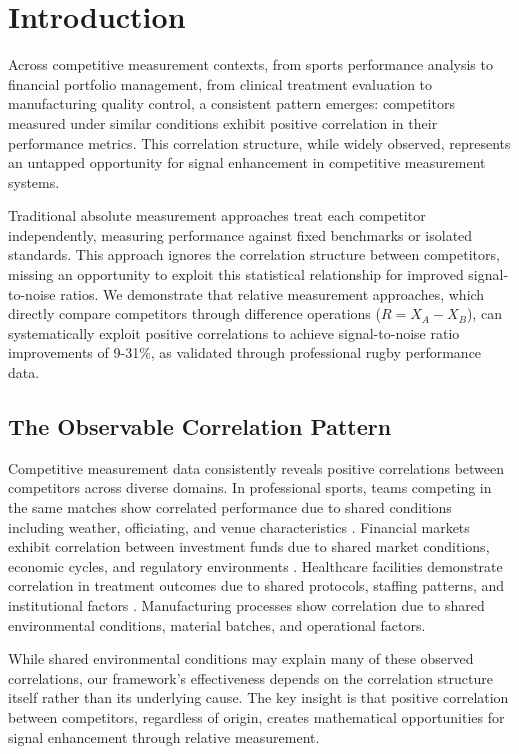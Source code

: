 \section{Introduction}

Across competitive measurement contexts, from sports performance analysis to financial portfolio management, from clinical treatment evaluation to manufacturing quality control, a consistent pattern emerges: competitors measured under similar conditions exhibit positive correlation in their performance metrics. This correlation structure, while widely observed, represents an untapped opportunity for signal enhancement in competitive measurement systems.

Traditional absolute measurement approaches treat each competitor independently, measuring performance against fixed benchmarks or isolated standards. This approach ignores the correlation structure between competitors, missing an opportunity to exploit this statistical relationship for improved signal-to-noise ratios. We demonstrate that relative measurement approaches, which directly compare competitors through difference operations ($R = X_A - X_B$), can systematically exploit positive correlations to achieve signal-to-noise ratio improvements of 9-31\%, as validated through professional rugby performance data.

\subsection{The Observable Correlation Pattern}

Competitive measurement data consistently reveals positive correlations between competitors across diverse domains. In professional sports, teams competing in the same matches show correlated performance due to shared conditions including weather, officiating, and venue characteristics \cite{bennett2019descriptive, scott2023performance}. Financial markets exhibit correlation between investment funds due to shared market conditions, economic cycles, and regulatory environments \cite{carhart1997persistence, fama1993common}. Healthcare facilities demonstrate correlation in treatment outcomes due to shared protocols, staffing patterns, and institutional factors \cite{iezzoni1997risk, normand2016statistical}. Manufacturing processes show correlation due to shared environmental conditions, material batches, and operational factors.

While shared environmental conditions may explain many of these observed correlations, our framework's effectiveness depends on the correlation structure itself rather than its underlying cause. The key insight is that positive correlation between competitors, regardless of origin, creates mathematical opportunities for signal enhancement through relative measurement.

